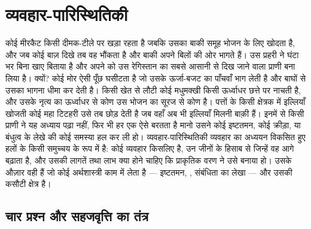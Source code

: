 \chapter{व्यवहार-पारिस्थितिकी}\label{ch:b3:behavioural-ecology}

कोई मीरकैट किसी दीमक-टीले पर खड़ा रहता है जबकि उसका बाकी समूह भोजन के
लिए खोदता है, और जब कोई बाज़ दिखे तब वह भौंकता है और बाकी अपने बिलों की
ओर भागते हैं। उस प्रहरी ने घंटा भर बिना खाए बिताया है और अपने को उस
रेगिस्तान का सबसे आसानी से दिख जाने वाला प्राणी बना लिया है। क्यों? कोई
मोर ऐसी पूँछ घसीटता है जो उसके ऊर्जा-बजट का पाँचवाँ भाग लेती है और
बाघों से उसका भागना धीमा कर देती है। किसी खेत से लौटी कोई मधुमक्खी किसी
ऊर्ध्वाधर छत्ते पर नाचती है, और उसके नृत्य का ऊर्ध्वाधर से कोण उस भोजन
का सूरज से कोण है। पत्तों के किसी क्षेत्रक में इल्लियाँ खोजती कोई महा
टिटहरी उसे तब छोड़ देती है जब वहाँ अब भी इल्लियाँ मिलनी बाक़ी हैं। इनमें
से किसी प्राणी ने यह अध्याय पढ़ा नहीं, फिर भी हर एक ऐसे बरतता है मानो
उसने कोई इष्टतमन, कोई क्रीड़ा, या बंधुत्व के लेखे की कोई समस्या हल कर ली
हो। व्यवहार-पारिस्थितिकी व्यवहार का अध्ययन विकसित हुए हलों के किसी
समुच्चय के रूप में है: कोई व्यवहार किसलिए है, उन जीनों के हिसाब से
जिन्हें वह आगे बढ़ाता है, और उसकी लागतें तथा लाभ क्या होने चाहिए कि
प्राकृतिक वरण ने उसे बनाया हो। उसके औज़ार वही हैं जो कोई अर्थशास्त्री
काम में लेता है --- इष्टतमन, , संबंधिता का लेखा --- और
उसकी कसौटी क्षेत्र है।

\section{चार प्रश्न और सहजवृत्ति का तंत्र}

